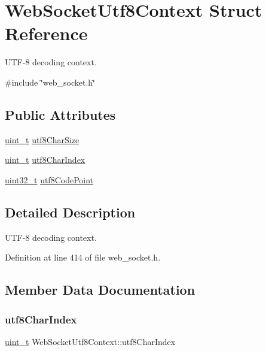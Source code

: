 \hypertarget{structWebSocketUtf8Context}{}\section{Web\+Socket\+Utf8\+Context Struct Reference}
\label{structWebSocketUtf8Context}


U\+T\+F-\/8 decoding context.  




{\ttfamily \#include \char`\"{}web\+\_\+socket.\+h\char`\"{}}

\subsection*{Public Attributes}
\begin{DoxyCompactItemize}
\item 
\hyperlink{compiler__port_8h_a12a1e9b3ce141648783a82445d02b58d}{uint\+\_\+t} \hyperlink{structWebSocketUtf8Context_a4a16550670061f8c363d4edb044238d0}{utf8\+Char\+Size}
\item 
\hyperlink{compiler__port_8h_a12a1e9b3ce141648783a82445d02b58d}{uint\+\_\+t} \hyperlink{structWebSocketUtf8Context_a8a4c6d59da995f7f9e03da5a8fe3634e}{utf8\+Char\+Index}
\item 
\hyperlink{stdint_8h_a435d1572bf3f880d55459d9805097f62}{uint32\+\_\+t} \hyperlink{structWebSocketUtf8Context_a9b49b73c1b03907044863848e71fe3d0}{utf8\+Code\+Point}
\end{DoxyCompactItemize}


\subsection{Detailed Description}
U\+T\+F-\/8 decoding context. 

Definition at line 414 of file web\+\_\+socket.\+h.



\subsection{Member Data Documentation}
\mbox{\label{structWebSocketUtf8Context_a8a4c6d59da995f7f9e03da5a8fe3634e}} 
\subsubsection{\texorpdfstring{utf8\+Char\+Index}{utf8CharIndex}}
{\footnotesize\ttfamily \hyperlink{compiler__port_8h_a12a1e9b3ce141648783a82445d02b58d}{uint\+\_\+t} Web\+Socket\+Utf8\+Context\+::utf8\+Char\+Index}



